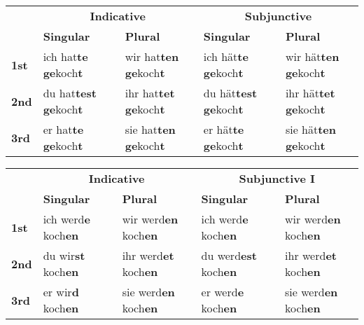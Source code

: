 \documentclass[a4paper,20pt]{article}
\newcommand{\grammarending}[1]{\textbf{\textcolor{endingcolor}{#1}}}
\begin{document}
\begin{tabular}{|l|l|l|l|l|}
\hline
\rowcolor{lightgray}
\multicolumn{5}{|c|}{\textbf{Pluperfect}} \\
\hline
\rowcolor{lightgray}
& \multicolumn{2}{c|}{\textbf{Indicative}} & \multicolumn{2}{c|}{\textbf{Subjunctive}} \\
\hline
\rowcolor{lightgray}
& \textbf{Singular} & \textbf{Plural} & \textbf{Singular} & \textbf{Plural} \\
\hline
\textbf{1st} & ich hat\grammarending{te} \grammarending{ge}koch\grammarending{t} & wir hat\grammarending{ten} \grammarending{ge}koch\grammarending{t} & ich hät\grammarending{te} \grammarending{ge}koch\grammarending{t} & wir hät\grammarending{ten} \grammarending{ge}koch\grammarending{t} \\
\hline
\textbf{2nd} & du hat\grammarending{test} \grammarending{ge}koch\grammarending{t} & ihr hat\grammarending{tet} \grammarending{ge}koch\grammarending{t} & du hät\grammarending{test} \grammarending{ge}koch\grammarending{t} & ihr hät\grammarending{tet} \grammarending{ge}koch\grammarending{t} \\
\hline
\textbf{3rd} & er hat\grammarending{te} \grammarending{ge}koch\grammarending{t} & sie hat\grammarending{ten} \grammarending{ge}koch\grammarending{t} & er hät\grammarending{te} \grammarending{ge}koch\grammarending{t} & sie hät\grammarending{ten} \grammarending{ge}koch\grammarending{t} \\
\hline
\end{tabular}

\begin{tabular}{|l|l|l|l|l|}
\hline
\rowcolor{lightgray}
\multicolumn{5}{|c|}{\textbf{Future I}} \\
\hline
\rowcolor{lightgray}
& \multicolumn{2}{c|}{\textbf{Indicative}} & \multicolumn{2}{c|}{\textbf{Subjunctive I}} \\
\hline
\rowcolor{lightgray}
& \textbf{Singular} & \textbf{Plural} & \textbf{Singular} & \textbf{Plural} \\
\hline
\textbf{1st} & ich werd\grammarending{e} koch\grammarending{en} & wir werd\grammarending{en} koch\grammarending{en} & ich werd\grammarending{e} koch\grammarending{en} & wir werd\grammarending{en} koch\grammarending{en} \\
\hline
\textbf{2nd} & du wir\grammarending{st} koch\grammarending{en} & ihr werd\grammarending{et} koch\grammarending{en} & du werd\grammarending{est} koch\grammarending{en} & ihr werd\grammarending{et} koch\grammarending{en} \\
\hline
\textbf{3rd} & er wir\grammarending{d} koch\grammarending{en} & sie werd\grammarending{en} koch\grammarending{en} & er werd\grammarending{e} koch\grammarending{en} & sie werd\grammarending{en} koch\grammarending{en} \\
\hline
\end{tabular}
\end{document}
